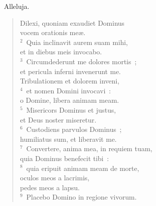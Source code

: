 ~\lettrine[lines=10,image=true,loversize=0.05,lraise=-0.03]{A}{}lleluja. \begin{flushleft}\begin{verse}\vspace{6pt}Dilexi, quoniam exaudiet Dominus\\ vocem orationis me\ae .\\
${}^{2}$~Quia inclinavit aurem suam mihi,\\ et in diebus meis invocabo.\\
${}^{3}$~Circumdederunt me dolores mortis~;\\ et pericula inferni invenerunt me.\\ Tribulationem et dolorem inveni,\\
${}^{4}$~et nomen Domini invocavi~:\\ o Domine, libera animam meam.\\
${}^{5}$~Misericors Dominus et justus,\\ et Deus noster miseretur.\\
${}^{6}$~Custodiens parvulos Dominus~;\\ humiliatus sum, et liberavit me.\\
${}^{7}$~Convertere, anima mea, in requiem tuam,\\ quia Dominus benefecit tibi~:\\
${}^{8}$~quia eripuit animam meam de morte,\\ oculos meos a lacrimis,\\ pedes meos a lapsu.\\
${}^{9}$~Placebo Domino in regione vivorum.\end{verse}\end{flushleft}


